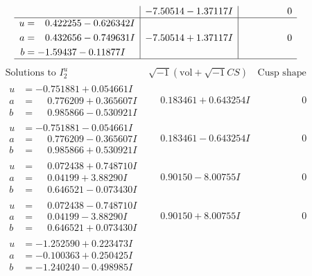 \documentclass[1p]{elsarticle_modified}
\theoremstyle{definition}
\newcommand{\I}{\sqrt{-1}}
\begin{document}
$$\begin{array}{c|c|c}
 & -7.50514 - 1.37117 I & \phantom{-0.000000 } 0 \\ \hline\begin{aligned}
u &= \phantom{-}0.422255 - 0.626342 I \\
a &= \phantom{-}0.432656 - 0.749631 I \\
b &= -1.59437 - 0.11877 I\end{aligned}
 & -7.50514 + 1.37117 I & \phantom{-0.000000 } 0\\
 \hline 
 \end{array}$$\newpage$$\begin{array}{c|c|c}  
\text{Solutions to }I^u_{2}& \I (\text{vol} + \sqrt{-1}CS) & \text{Cusp shape}\\
 \hline 
\begin{aligned}
u &= -0.751881 + 0.054661 I \\
a &= \phantom{-}0.776209 + 0.365607 I \\
b &= \phantom{-}0.985866 - 0.530921 I\end{aligned}
 & \phantom{-}0.183461 + 0.643254 I & \phantom{-0.000000 } 0 \\ \hline\begin{aligned}
u &= -0.751881 - 0.054661 I \\
a &= \phantom{-}0.776209 - 0.365607 I \\
b &= \phantom{-}0.985866 + 0.530921 I\end{aligned}
 & \phantom{-}0.183461 - 0.643254 I & \phantom{-0.000000 } 0 \\ \hline\begin{aligned}
u &= \phantom{-}0.072438 + 0.748710 I \\
a &= \phantom{-}0.04199 + 3.88290 I \\
b &= \phantom{-}0.646521 - 0.073430 I\end{aligned}
 & \phantom{-}0.90150 - 8.00755 I & \phantom{-0.000000 } 0 \\ \hline\begin{aligned}
u &= \phantom{-}0.072438 - 0.748710 I \\
a &= \phantom{-}0.04199 - 3.88290 I \\
b &= \phantom{-}0.646521 + 0.073430 I\end{aligned}
 & \phantom{-}0.90150 + 8.00755 I & \phantom{-0.000000 } 0 \\ \hline\begin{aligned}
u &= -1.252590 + 0.223473 I \\
a &= -0.100363 + 0.250425 I \\
b &= -1.240240 - 0.498985 I\end{aligned}

\end{array}$$
\end{document}

